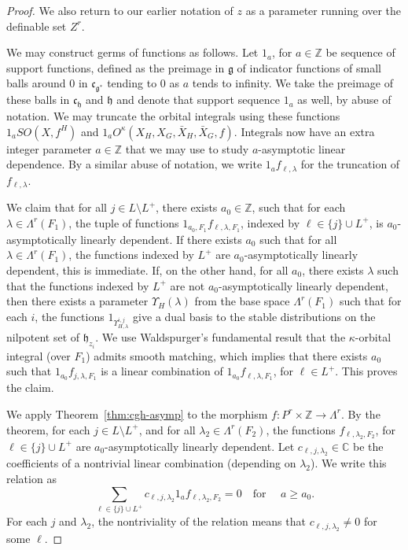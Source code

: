 \documentclass[12pt]{amsart}
\newcommand{\ring}[1]{{\mathbb #1}}
\def\Y{\Upsilon}
\newcommand{\fg}{\mathfrak{g}}
\newcommand{\fc}{\mathfrak{c}}
\newcommand{\fh}{\mathfrak{h}}
\theoremstyle{plain}
\theoremstyle{definition}
\begin{document}
\begin{proof}
We also return to our earlier notation of $z$ as a
parameter running over the definable set $Z^r$.


We may construct germs of functions as follows.  Let $1_a$, for
$a\in\ring{Z}$ be sequence of support functions, defined as the
preimage in $\fg$ of indicator functions of small balls around $0$ in
$\fc_{\fg^*}$ tending to $0$ as $a$ tends to infinity.  We take the
preimage of these balls in $\fc_{\fh}$ and $\fh$ and denote that
support sequence $1_a$ as well, by abuse of notation.  We may truncate
the orbital integrals using these functions $1_a SO(X,f^H)$ and
$1_a O^\kappa(X_H,X_G,\bar X_H,\bar X_G,f)$.  Integrals now have an
extra integer parameter $a\in\ring{Z}$ that we may use to study
$a$-asymptotic linear dependence.  By a similar abuse of notation, we
write $1_a f_{\ell,\lambda}$ for the truncation of $f_{\ell,\lambda}$.

We claim that for all $j \in L\setminus L^+$, there exists
$a_0\in\ring{Z}$, such that for each $\lambda\in \Lambda^r(F_1)$, the
tuple of functions $1_{a_0,F_1}f_{\ell,\lambda,F_1}$, indexed by $\ell\in \{j\}\cup
L^+$, is $a_0$-asymptotically linearly dependent.  If there
exists $a_0$ such that for all $\lambda\in \Lambda^r(F_1)$, the
functions indexed by $L^+$ are $a_0$-asymptotically linearly
dependent, this is immediate.  If, on the other hand, for all $a_0$,
there exists $\lambda$ such that the functions indexed by $L^+$
are not $a_0$-asymptotically linearly dependent, then there exists a
parameter $\Y_H(\lambda)$ from the base space $\Lambda^r(F_1)$ such
that for each $i$, the functions $1_{\Y_{H,\lambda}^{i,j}}$ give a
dual basis to the stable distributions on the nilpotent set of
$\fh_{z_i}$.  We use Waldspurger's fundamental result
\cite{waldspurger1997lemme} that the $\kappa$-orbital integral (over
$F_1$) admits smooth matching, which implies that there exists $a_0$
such that $1_{a_0}f_{j,\lambda,F_1}$ is a linear combination of
$1_{a_0}f_{\ell,\lambda,F_1}$, for $\ell\in L^+$.  This proves the
claim.


We apply Theorem~\ref{thm:cgh-asymp} to the morphism $f:P^r\times\ring{Z}\to \Lambda^r$.  
By the theorem, for each
$j\in L\setminus L^+$, and for all $\lambda_2\in \Lambda^r({F_2})$, the
functions $f_{\ell,\lambda_2,F_2}$, for $\ell\in \{j\}\cup L^+$ are
$a_0$-asymptotically linearly dependent.  Let $c_{\ell,j,\lambda_2}\in
\ring{C}$ be the coefficients of a nontrivial linear combination
(depending on $\lambda_2$).  We write this relation as
\begin{equation}\label{eqn:du}
\sum_{\ell\in \{j\}\cup L^+} c_{\ell,j,\lambda_2}1_af_{\ell,\lambda_2,F_2}  =
0\quad\text{for }\quad a\ge a_0.
\end{equation}
For each $j$ and $\lambda_2$, the nontriviality of the relation
means
that $c_{\ell,j,\lambda_2}\ne 0$ for some $\ell$.


\end{proof}
\end{document}
